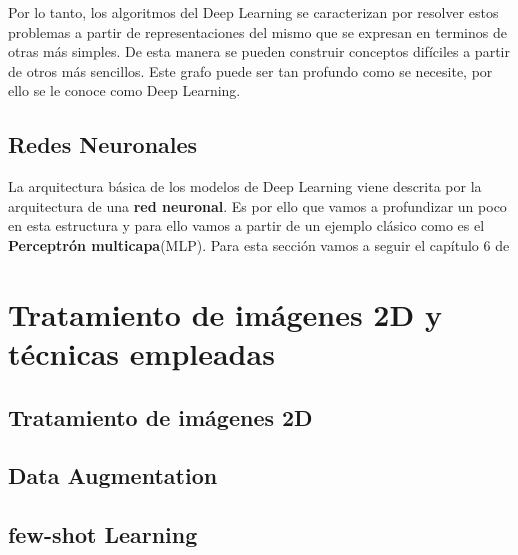     Por lo tanto, los algoritmos del Deep Learning se caracterizan por resolver estos problemas a partir de representaciones del mismo que se expresan en terminos de otras más simples. De esta manera se pueden construir conceptos difíciles a partir de otros más sencillos. Este grafo puede ser tan profundo como se necesite, por ello se le conoce como Deep Learning.

    \subsection{Redes Neuronales}
        La arquitectura básica de los modelos de Deep Learning viene descrita por la arquitectura de una \textbf{red neuronal}. Es por ello que vamos a profundizar un poco en esta estructura y para ello vamos a partir de un ejemplo clásico como es el \textbf{Perceptrón multicapa}(MLP). Para esta sección vamos a seguir el capítulo 6 de \cite{Goodfellow-et-al-2016}

\section{Tratamiento de imágenes 2D y técnicas empleadas}
    \subsection{Tratamiento de imágenes 2D}

    \subsection{Data Augmentation}

    \subsection{few-shot Learning}

\endinput

